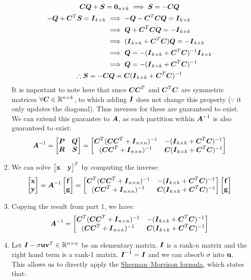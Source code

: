 \documentclass[]{exam}
\begin{document}
\begin{questions}
\begin{enumerate}[label=\arabic*.]
\begin{gather*}
			\mC \mQ + \mS = \mathbf{0}_{n \times k} \implies \mS = - \mC \mQ \\
			\begin{aligned}
				-\mQ + \mC^T \mS = \mI_{k \times k} &\implies -\mQ - \mC^T \mC \mQ= \mI_{k \times k} \\
				&\implies \mQ + \mC^T \mC \mQ= -\mI_{k \times k} \\
				&\implies (\mI_{k \times k} + \mC^T \mC)\mQ = -\mI_{k \times k} \\
				&\implies \mQ = - (\mI_{k \times k} + \mC^T \mC)^{-1} \mI_{k \times k} \\
				&\implies \mQ = - (\mI_{k \times k} + \mC^T \mC)^{-1}
			\end{aligned} \\
			\therefore \mS = - \mC \mQ = \mC (\mI_{k \times k} + \mC^T \mC)^{-1} \\
		\end{gather*}
		It is important to note here that since $\mC \mC^T$ and $\mC^T\mC$ are symmetric matrices $\forall \mC \in \mathbb{R}^{n \times k}$, to which adding $\mI$ does not change this property ($\because$ it only updates the diagonal). Thus inverses for these are guaranteed to exist. We can extend this guarantee to $\mA$, as each partition within $\mA^{-1}$ is also guaranteed to exist:
		$$ \mA^{-1} = \bmat{\mP & \mQ \\ \mR & \mS} = \bmat{\mC^T (\mC \mC^T + \mI_{n \times n})^{-1} & -(\mI_{k \times k} + \mC^T \mC)^{-1} \\ (\mC \mC^T + \mI_{n \times n})^{-1} & \mC (\mI_{k \times k} + \mC^T \mC)^{-1}} $$
	\item We can solve $\bmat{\vx & \vy}^T$ by computing the inverse:
		$$
		\bmat{\vx \\ \vy} = \mA^{-1} \bmat{\vf \\ \vg} = \bmat{\mC^T (\mC \mC^T + \mI_{n \times n})^{-1} & -(\mI_{k \times k} + \mC^T \mC)^{-1} \\ (\mC \mC^T + \mI_{n \times n})^{-1} & \mC (\mI_{k \times k} + \mC^T \mC)^{-1}} \bmat{\vf \\ \vg}
		$$
	\item Copying the result from part 1, we have:
		$$ \mA^{-1} = \bmat{\mC^T (\mC \mC^T + \mI_{n \times n})^{-1} & -(\mI_{k \times k} + \mC^T \mC)^{-1} \\ (\mC \mC^T + \mI_{n \times n})^{-1} & \mC (\mI_{k \times k} + \mC^T \mC)^{-1}} $$
	\item 
		Let $\mI - \sigma \vu \vv^T \in \mathbb{R}^{n \times n}$ be an elementary matrix. $\mI$ is a rank-$n$ matrix and the right hand term is a rank-1 matrix. $\mI^{-1} = \mI$ and we can absorb $\sigma$ into $\vu$. This allows us to directly apply the \href{https://en.wikipedia.org/wiki/Sherman\%E2\%80\%93Morrison\_formula}{Sherman–Morrison formula}, which states that:

\end{enumerate}
\end{questions}
\end{document}
